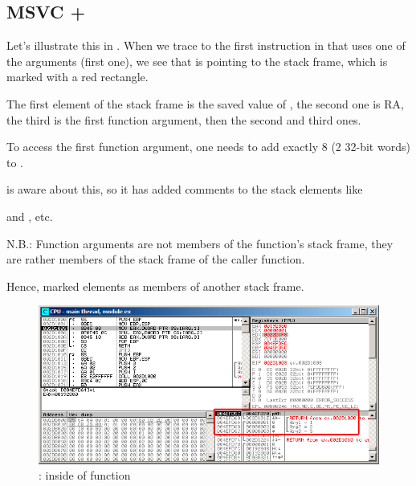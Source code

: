 \subsection{MSVC + \olly}
\myindex{\olly}
Let's illustrate this in \olly.
When we trace to the first instruction in \ttf that uses one of the arguments 
(first one), we see that \EBP is pointing to the \gls{stack frame}, 
which is marked with a red rectangle.

The first element of the \gls{stack frame} is the saved value of \EBP, 
the second one is \ac{RA}, the third is the first function argument, then the second and third ones.

To access the first function argument, one needs to add exactly 8 (2 32-bit words) to \EBP.

\olly is aware about this, so it has added comments to the stack elements like

 and , etc.

N.B.: Function arguments are not members of the function's stack frame, they are rather
members of the stack frame of the \gls{caller} function.

Hence, \olly marked  elements as members of another stack frame.

\begin{figure}[H]
\centering
\includegraphics[scale=\FigScale]{patterns/05_passing_arguments/olly.png}
\caption{\olly: inside of \ttf{} function}
\label{fig:passing_arguments_olly}
\end{figure}

